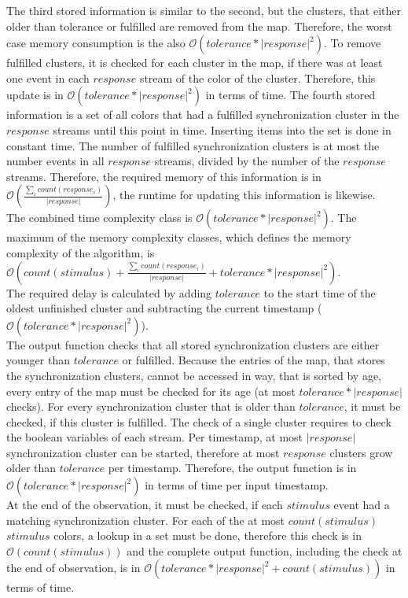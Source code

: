 	The third stored information is similar to the second, but the clusters, that either older than tolerance or fulfilled are removed from the map. Therefore, the worst case memory consumption is the also $\mathcal{O}(tolerance*|response|^2)$. To remove fulfilled clusters, it is checked for each cluster in the map, if there was at least one event in each $response$ stream of the color of the cluster. Therefore, this update is in $\mathcal{O}(tolerance*|response|^2)$ in terms of time.
	The fourth stored information is a set of all colors that had a fulfilled synchronization cluster in the $response$ streams until this point in time. Inserting items into the set is done in constant time. The number of fulfilled synchronization clusters is at most the number events in all $response$ streams, divided by the number of the $response$ streams. Therefore, the required memory of this information is in $\mathcal{O}\left(\frac{\sum_i count(response_i)}{|response|}\right)$, the runtime for updating this information is likewise.\\
	The combined time complexity class is $\mathcal{O}(tolerance*|response|^2)$. The maximum of the memory complexity classes, which defines the memory complexity of the algorithm, is $\mathcal{O}\left(count(stimulus)+\frac{\sum_i count(response_i)}{|response|}+tolerance*|response|^2\right)$.\\
	The required delay is calculated by adding $tolerance$ to the start time of the oldest unfinished cluster and subtracting the current timestamp ($\mathcal{O}(tolerance*|response|^2)$).\\
	The output function checks that all stored synchronization clusters are either younger than $tolerance$ or fulfilled.
	Because the entries of the map, that stores the synchronization clusters, cannot be accessed in way, that is sorted by age, every entry of the map must be checked for its age (at most $tolerance*|response|$ checks). For every synchronization cluster that is older than $tolerance$, it must be checked, if this cluster is fulfilled. The check of a single cluster requires to check the boolean variables of each stream. Per timestamp, at most $|response|$ synchronization cluster can be started, therefore at most $response$ clusters grow older than $tolerance$ per timestamp. Therefore, the output function is in $\mathcal{O}(tolerance*|response|^2)$ in terms of time per input timestamp.\\
	At the end of the observation, it must be checked, if each $stimulus$ event had a matching synchronization cluster. For each of the at most $count(stimulus)$ $stimulus$ colors, a lookup in a set must be done, therefore this check is in $\mathcal{O}(count(stimulus))$ and the complete output function, including the check at the end of observation, is in $\mathcal{O}(tolerance*|response|^2 + count(stimulus))$ in terms of time.



